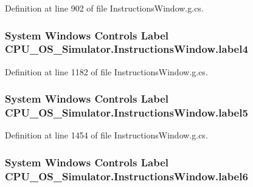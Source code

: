 Definition at line 902 of file Instructions\+Window.\+g.\+cs.

\hypertarget{class_c_p_u___o_s___simulator_1_1_instructions_window_a6d028c99fa713c891d86c07ef46f083b}{}
\subsubsection[{label4}]{\setlength{\rightskip}{0pt plus 5cm}System Windows Controls Label C\+P\+U\+\_\+\+O\+S\+\_\+\+Simulator.\+Instructions\+Window.\+label4\hspace{0.3cm}{\ttfamily [package]}}\label{class_c_p_u___o_s___simulator_1_1_instructions_window_a6d028c99fa713c891d86c07ef46f083b}


Definition at line 1182 of file Instructions\+Window.\+g.\+cs.

\hypertarget{class_c_p_u___o_s___simulator_1_1_instructions_window_acfbda3e1b251a166abc72a07d4cb5025}{}
\subsubsection[{label5}]{\setlength{\rightskip}{0pt plus 5cm}System Windows Controls Label C\+P\+U\+\_\+\+O\+S\+\_\+\+Simulator.\+Instructions\+Window.\+label5\hspace{0.3cm}{\ttfamily [package]}}\label{class_c_p_u___o_s___simulator_1_1_instructions_window_acfbda3e1b251a166abc72a07d4cb5025}


Definition at line 1454 of file Instructions\+Window.\+g.\+cs.

\hypertarget{class_c_p_u___o_s___simulator_1_1_instructions_window_a23cbea70a5e1ab92348a9569f362db07}{}
\subsubsection[{label6}]{\setlength{\rightskip}{0pt plus 5cm}System Windows Controls Label C\+P\+U\+\_\+\+O\+S\+\_\+\+Simulator.\+Instructions\+Window.\+label6\hspace{0.3cm}{\ttfamily [package]}}\label{class_c_p_u___o_s___simulator_1_1_instructions_window_a23cbea70a5e1ab92348a9569f362db07}


